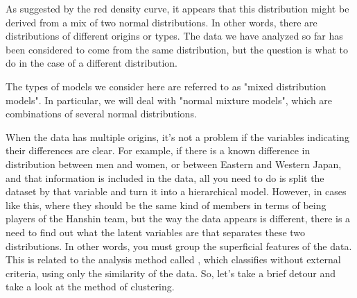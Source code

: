 \documentclass{ltjsbook}
\begin{document}
As suggested by the red density curve, it appears that this distribution might be derived from a mix of two normal distributions. In other words, there are distributions of different origins or types.
The data we have analyzed so far has been considered to come from the same distribution, but the question is what to do in the case of a different distribution.

The types of models we consider here are referred to as "mixed distribution models". In particular, we will deal with "normal mixture models", which are combinations of several normal distributions.

When the data has multiple origins, it's not a problem if the variables indicating their differences are clear. For example, if there is a known difference in distribution between men and women, or between Eastern and Western Japan, and that information is included in the data, all you need to do is split the dataset by that variable and turn it into a hierarchical model. However, in cases like this, where they should be the same kind of members in terms of being players of the Hanshin team, but the way the data appears is different, there is a need to find out what the latent variables are that separates these two distributions.
In other words, you must group the superficial features of the data. This is related to the analysis method called , which classifies without external criteria, using only the similarity of the data.
So, let's take a brief detour and take a look at the method of clustering.
\end{document}
